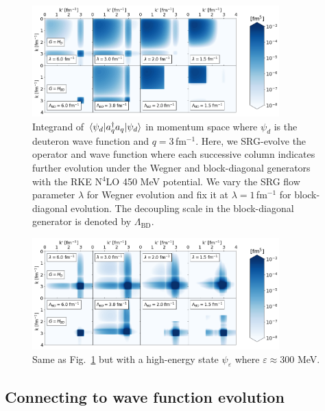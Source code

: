 \documentclass[10pt,aps,prc,floatfix,twocolumn,nofootinbib]{revtex4-1}
\newcommand{\LambdaBD}{{\Lambda_{\text{BD}}}}
\newcommand{\ataq}{a^{\dagger}_q a_q}
\begin{document}
%
\begin{figure}[tbh]
	\includegraphics[clip,width=0.85\textwidth]{momentum_projection_integrand_contours_q3p00_kvnn_111.png}%
	\caption{Integrand of $\mel{\psi_d}{\ataq}{\psi_d}$ in momentum space where $\psi_d$ is the deuteron wave function and $q=3$\,fm$^{-1}$. Here, we SRG-evolve the operator and wave function where each successive column indicates further evolution under the Wegner and block-diagonal generators with the RKE N$^4$LO 450 MeV potential. We vary the SRG flow parameter $\lambda$ for Wegner evolution and fix it at $\lambda=1$\,fm$^{-1}$ for block-diagonal evolution. The decoupling scale in the block-diagonal generator is denoted by $\LambdaBD$.}
	\label{fig:momentum_projection_integrand_contours_q3,00_RKE}
\end{figure}
%
\begin{figure}[tbh]
	\includegraphics[clip,width=0.85\textwidth]{momentum_projection_integrand_contours_q3p00_kvnn_111_eps300p0.png}%
	\caption{Same as Fig.~\ref{fig:momentum_projection_integrand_contours_q3,00_RKE} but with a high-energy state $\psi_{\varepsilon}$ where $\varepsilon \approx 300$ MeV.}
	\label{fig:momentum_projection_integrand_contours_q3,00_eps300_RKE}
\end{figure}
%

\subsection{Connecting to wave function evolution}
\label{subsec:connecting}
\end{document}
